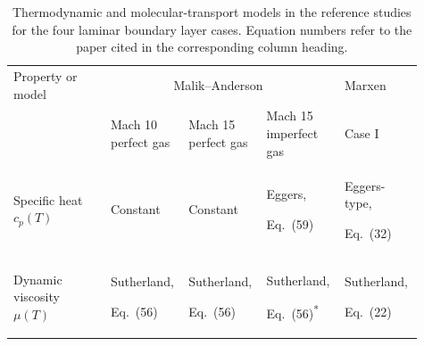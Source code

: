\begin{table}[H]
    \centering
    \caption{Thermodynamic and molecular-transport models in the reference
        studies for the four laminar boundary layer cases. Equation numbers
        refer to the paper cited in the corresponding column heading.}
    \label{tab:laminar-bl-thermal-models}
    \small
    \setlength{\tabcolsep}{4pt}
    \renewcommand{\arraystretch}{1.15}
    \begin{tabular}{@{}p{0.23\linewidth}p{0.165\linewidth}p{0.165\linewidth}p{0.17\linewidth}p{0.18\linewidth}@{}}
        \toprule
        Property or model
            & \multicolumn{3}{c}{Malik--Anderson~\citep{MalikAnderson1991RealGas}}
            & Marxen~\citep{Marxen2011HighOrder} \\
        \cmidrule(lr){2-4}
            & \shortstack[l]{Mach 10\\perfect gas}
            & \shortstack[l]{Mach 15\\perfect gas}
            & \shortstack[l]{Mach 15\\imperfect gas}
            & Case I \\
        \midrule
        \raggedright Specific heat \(c_p(T)\)
            & {\raggedright Constant}
            & {\raggedright Constant}
            & {\raggedright Eggers,\par Eq.~(59)\par}
            & {\raggedright Eggers-type,\par Eq.~(32)\par} \\
        \addlinespace
        \raggedright Dynamic viscosity \(\mu(T)\)
            & {\raggedright Sutherland,\par Eq.~(56)\par}
            & {\raggedright Sutherland,\par Eq.~(56)\par}
            & {\raggedright Sutherland,\par Eq.~(56)\textsuperscript{*}\par}
            & {\raggedright Sutherland,\par Eq.~(22)\par} \\

\end{tabular}
\end{table}
